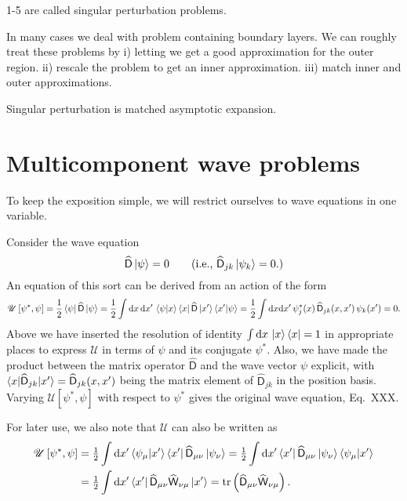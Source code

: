 1-5 are called singular perturbation problems.

In many cases we deal with problem containing boundary layers. We can roughly treat these problems by
i) letting  we get a good approximation for the outer region.
ii) rescale the problem to get an inner approximation.
iii) match inner and outer approximations.

Singular perturbation is matched asymptotic expansion.

\section{Multicomponent wave problems}

To keep the exposition simple, we will restrict ourselves to wave equations in one variable.

Consider the wave equation
%
\begin{equation}
  \widehat{\mathsf{D}}\mathinner{\lvert{\psi}\rangle} = 0
  \qquad
  (\text{i.e., }\widehat{\mathsf{D}}_{jk}\mathinner{\lvert{\psi_{k}}\rangle} = 0.)
\end{equation}
%
An equation of this sort can be derived from an action of the form
%
\begin{equation}
  \mathscr{U}\left[\psi^{*}, \psi\right] = \frac{1}{2}\mathinner{\langle{\psi}\rvert}\widehat{\mathsf{D}}\mathinner{\lvert{\psi}\rangle}
  = \frac{1}{2}\int \mathrm{d}{x}\,\mathrm{d}{x'}\, \mathinner{\langle{\psi|x}\rangle}\mathinner{\langle{x}\rvert}\widehat{\mathsf{D}}\mathinner{\lvert{x'}\rangle}\mathinner{\langle{x'|\psi}\rangle}
  = \frac{1}{2}\int \mathrm{d}{x}\mathrm{d}{x'}\, \psi^{*}_{j}(x)\,\widehat{\mathsf{D}}_{jk}(x, x')\,\psi_{k}(x') = 0.
\end{equation}
%
Above we have inserted the resolution of identity $\int \mathrm{d}{x}\,\mathinner{\lvert{x}\rangle}\mathinner{\langle{x}\rvert} = 1$ in appropriate places to express $\mathscr{U}$ in terms of $\psi$ and its conjugate $\psi^{*}$.
Also, we have made the product between the matrix operator $\widehat{\mathsf{D}}$ and the wave vector $\psi$ explicit, with $\mathinner{\langle{x|\widehat{\mathsf{D}}_{jk}|x'}\rangle} = \widehat{\mathsf{D}}_{jk}(x, x')$ being the matrix element of $\widehat{\mathsf{D}}_{jk}$ in the position basis.
Varying $\mathscr{U}[\psi^{*}, \psi]$ with respect to $\psi^{*}$ gives the original wave equation, Eq.~XXX.

For later use, we also note that $\mathscr{U}$ can also be written as
%
\begin{equation}
  \begin{aligned}
    \mathscr{U}\left[\psi^{*}, \psi\right] &= \tfrac{1}{2}\int \mathrm{d}{x}' \mathinner{\langle{\psi_{\mu}|x'}\rangle}\mathinner{\langle{x'}\rvert}\widehat{\mathsf{D}}_{\mu\nu}\mathinner{\lvert{\psi_{\nu}}\rangle}
= \tfrac{1}{2}\int \mathrm{d}{x}' \mathinner{\langle{x'}\rvert}\widehat{\mathsf{D}}_{\mu\nu}\mathinner{\lvert{\psi_{\nu}}\rangle} \mathinner{\langle{\psi_{\mu}|x'}\rangle}\\
&= \tfrac{1}{2}\int \mathrm{d}{x}' \mathinner{\langle{x'}\rvert}\widehat{\mathsf{D}}_{\mu\nu}\widehat{\mathsf{W}}_{\nu\mu}\mathinner{\lvert{x'}\rangle} = \operatorname{tr}\left(\widehat{\mathsf{D}}_{\mu\nu}\widehat{\mathsf{W}}_{\nu\mu}\right).
  \end{aligned}
\end{equation}
%

